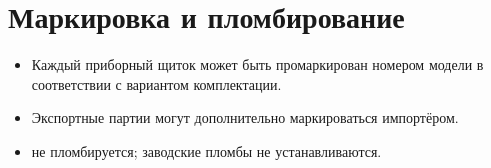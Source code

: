\chapter{Маркировка и пломбирование}\label{ch:marking-ru}

\begin{itemize}
    \item Каждый приборный щиток может быть промаркирован номером модели в соответствии с вариантом комплектации.
    \item Экспортные партии могут дополнительно маркироваться импортёром.
    \item \ReplicaGenOne{} не пломбируется; заводские пломбы не устанавливаются.
\end{itemize}
